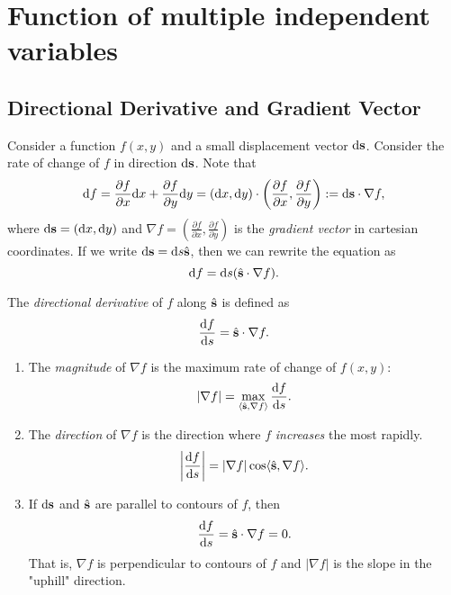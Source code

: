 \documentclass[10pt]{article}
\def\d{{\mathrm d}}
\begin{document}
    \section{Function of multiple independent variables}
    \subsection{Directional Derivative and Gradient Vector}
    Consider a function $f(x,y)$ and a small displacement vector $ \d \bfs $. Consider the rate of change of $f$ in direction $ \d \bfs $. Note that 
    \[
        \d f = \frac{\partial f}{\partial x}\d x+ \frac{\partial f}{\partial y}\d y = (\d x,\d y) \cdot \left( \frac{\partial f}{\partial x} ,\frac{\partial f}{\partial y}\right):=\d\bfs \cdot \nabla f,
    \]
    where $ \d \bfs=(\d x,\d y) $ and $ \nabla f = \left( \frac{\partial f}{\partial x} ,\frac{\partial f}{\partial y}\right) $ is the \textit{gradient vector} in cartesian coordinates. If we write $ \d \bfs=\d s \hat{\bfs} $, then we can rewrite the equation as 
    \[
        \d f = \d s (\hat{\bfs}\cdot \nabla f).
    \]
    \begin{definition}
        The \textit{directional derivative} of $f$ along $\hat{{\bf s}}$ is defined as 
        \[
            \frac{\mathrm{d}f}{\mathrm{d}s} = \hat{{\bf s}} \cdot \nabla f. 
        \]
    \end{definition}
    \begin{proposition}\label{prop:properties of gradient vector}
        \begin{enumerate}
            \item The \textit{magnitude} of $\nabla f$ is the maximum rate of change of $f(x,y)$:
            \[
                \left| \nabla f \right| = \max_{\langle \hat{{\bf s}}, \nabla f \rangle } \frac{\mathrm{d}f}{\mathrm{d}s}. 
            \]
            \item The \textit{direction} of $\nabla f$ is the direction where $f$ \textit{increases} the most rapidly.
            \[
                \left| \frac{\mathrm{d}f}{\mathrm{d}s}  \right| = \left| \nabla f\right| \cos \langle \hat{{\bf s}},\nabla f \rangle.
            \]
            \item If $ \d \bfs $ and $\hat{{\bf s}}$ are parallel to contours of $f$, then 
            \[
                \frac{\mathrm{d}f}{\mathrm{d}s}=\hat{{\bf s}} \cdot \nabla f=0. 
            \]
            That is, $ \nabla f $ is perpendicular to contours of $f$ and $ |\nabla f| $ is the slope in the "uphill" direction.
        \end{enumerate}
    \end{proposition}
\end{document}
